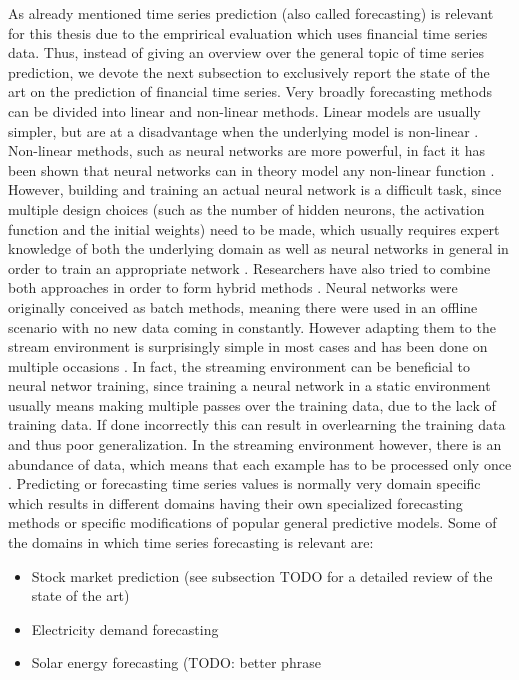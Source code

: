 As already mentioned time series prediction (also called forecasting) is relevant for this thesis due to the emprirical evaluation which uses financial time series data. Thus, instead of giving an overview over the general topic of time series prediction, we devote the next subsection to exclusively report the state of the art on the prediction of financial time series. Very broadly forecasting methods can be divided into linear and non-linear methods. Linear models are usually simpler, but are at a disadvantage when the underlying model is non-linear \cite{zhang2003time}. Non-linear methods, such as neural networks are more powerful, in fact it has been shown that neural networks can in theory model any non-linear function \cite{abraham2005artificial} \cite{funahashi1989approximate}. However, building and training an actual neural network is a difficult task, since multiple design choices (such as the number of hidden neurons, the activation function and the initial weights) need to be made, which usually requires expert knowledge of both the underlying domain as well as neural networks in general in order to train an appropriate network \cite{abraham2005artificial}. Researchers have also tried to combine both approaches in order to form hybrid methods \cite{zhang2003time}. \newline
Neural networks were originally conceived as batch methods, meaning there were used in an offline scenario with no new data coming in constantly. However adapting them to the stream environment is surprisingly simple in most cases and has been done on multiple occasions \cite{chang2002real} \cite{frank2001time}. In fact, the streaming environment can be beneficial to neural networ training, since training a neural network in a static environment usually means making multiple passes over the training data, due to the lack of training data. If done incorrectly this can result in overlearning the training data and thus poor generalization. In the streaming environment however, there is an abundance of data, which means that each example has to be processed only once \cite{gama2010knowledge}. \newline
Predicting or forecasting time series values is normally very domain specific which results in different domains having their own specialized forecasting methods or specific modifications of popular general predictive models. Some of the domains in which time series forecasting is relevant are:

\begin{itemize}
	\item Stock market prediction (see subsection TODO for a detailed review of the state of the art)
	\item Electricity demand forecasting 
	\item Solar energy forecasting (TODO: better phrase
\end{itemize}

